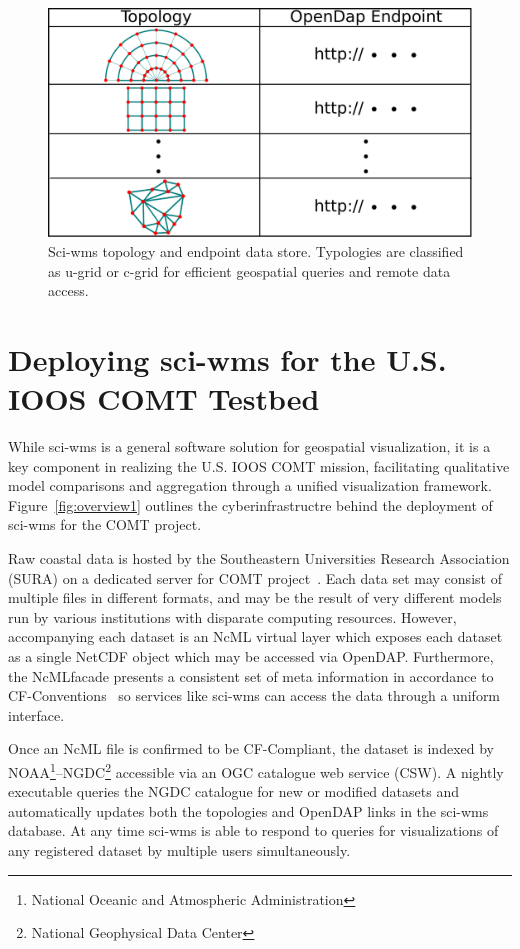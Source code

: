 \documentclass[11pt,twocolumn,twoside]{IEEEtran}
\newcommand{\comt}{COMT}
\newcommand{\ioos}{IOOS}
\newcommand{\sura}{SURA}
\newcommand{\ogc}{OGC}
\newcommand{\csw}{CSW}
\newcommand{\ugrid}{u-grid}
\newcommand{\cgrid}{c-grid}
\newcommand{\ncml}{NcML}
\newcommand{\noaa}{NOAA}
\newcommand{\ngdc}{NGDC}
\newcommand{\opendap}{OpenDAP}
\newcommand{\netcdf}{NetCDF}
\newcommand{\sciwms}{sci-wms}
\newcommand{\Sciwms}{Sci-wms}
\begin{document}
\begin{figure}
  \centering
  \includegraphics[width=\columnwidth]{./figs/sciwms_db_topology_endpoints.pdf}
  \caption{\Sciwms{} topology and endpoint data store. Typologies are
    classified as \ugrid{} or \cgrid{} for efficient geospatial
    queries and remote data access.}
  \label{fig:sciwms_topology_endpoints}
\end{figure}

\section{Deploying \sciwms{} for the U.S. \ioos{} \comt{} Testbed}
While \sciwms{} is a general software solution for geospatial
visualization, it is a key component in realizing the U.S. \ioos{}
\comt{} mission, facilitating qualitative model comparisons and
aggregation through a unified visualization
framework. Figure~\ref{fig:overview1} outlines the cyberinfrastructre
behind the deployment of \sciwms{} for the \comt{} project.

Raw coastal data is hosted by the Southeastern Universities Research
Association (\sura{}) on a dedicated server for \comt{}
project~\cite{luettich12}. Each data set may consist of multiple files
in different formats, and may be the result of very different models
run by various institutions with disparate computing
resources. However, accompanying each dataset is an \ncml{} virtual
layer which exposes each dataset as a single \netcdf{} object which
may be accessed via \opendap{}. Furthermore, the \ncml facade presents
a consistent set of meta information in accordance to
CF-Conventions~\cite{cf} so services like \sciwms{} can access
the data through a uniform interface.

Once an \ncml{} file is confirmed to be CF-Compliant, the dataset is
indexed by \noaa{}\footnote{National Oceanic and Atmospheric
  Administration}--\ngdc{}\footnote{National Geophysical Data Center}
accessible via an \ogc{} catalogue web service (\csw{}). A
nightly executable queries the \ngdc{} catalogue for new or modified
datasets and automatically updates both the topologies and \opendap{}
links in the \sciwms{} database. At any time \sciwms{} is able to
respond to queries for visualizations of any registered dataset by
multiple users simultaneously.




\end{document}
